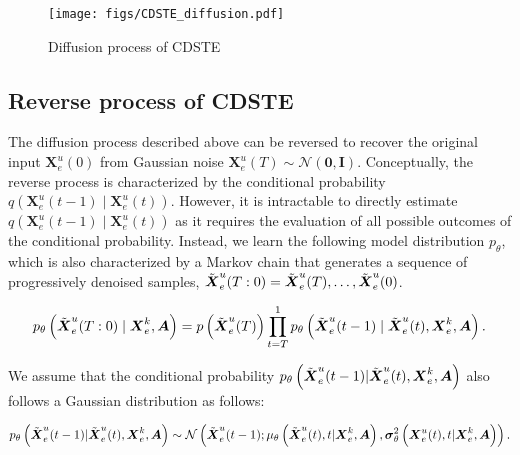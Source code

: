 \documentclass[a4paper,fleqn,12pt]{cas-sc}
\begin{document}
\begin{figure}[pos=htbp,width=8cm,align=\centering]
  \centering 
  \texttt{[image: figs/CDSTE\_diffusion.pdf]}
  \caption{Diffusion process of CDSTE}\label{fig:CDSTE_diffusion}
\end{figure}

\subsection{Reverse process of CDSTE}
The diffusion process described above can be reversed to recover the original input $\boldsymbol{X}^{u}_{e}(0)$ from Gaussian noise $\boldsymbol{X}^{u}_{e}(T) \sim \mathcal{N}\left(\boldsymbol{0}, \boldsymbol{I}\right)$. Conceptually, the reverse process is characterized by the conditional probability $q\left(\boldsymbol{X}^{u}_{e}(t-1) \mid \boldsymbol{X}^{u}_{e}(t)\right)$. However, it is intractable to directly estimate $q\left(\boldsymbol{X}^{u}_{e}(t-1) \mid \boldsymbol{X}^{u}_{e}(t)\right)$ as it requires the evaluation of all possible outcomes of the conditional probability. Instead, we learn the following model distribution $p_{\theta}$, which is also characterized by a Markov chain that generates a sequence of progressively denoised samples, $\Tilde{\boldsymbol{X}}^{u}_{e}(T:0)=\Tilde{\boldsymbol{X}}^{u}_{e}(T), \ldots, \Tilde{\boldsymbol{X}}^{u}_{e}(0)$.
\begin{linenomath*}
\begin{equation}
p_\theta\left(\Tilde{\boldsymbol{X}}^{u}_{e}(T:0)\mid \boldsymbol{X}^{k}_{e}, \boldsymbol{A}\right)=p\left(\Tilde{\boldsymbol{X}}^{u}_{e}(T)\right) \prod_{t=T}^{1} p_\theta\left(\Tilde{\boldsymbol{X}}^{u}_{e}(t-1) \mid \Tilde{\boldsymbol{X}}^{u}_{e}(t), \boldsymbol{X}^{k}_{e}, \boldsymbol{A}\right).
\label{equ:CondReverseMarkov}
\end{equation}
\end{linenomath*}
\noindent We assume that the conditional probability $p_\theta\left(\Tilde{\boldsymbol{X}}^{u}_{e}(t-1) | \Tilde{\boldsymbol{X}}^{u}_{e}(t), \boldsymbol{X}^{k}_{e}, \boldsymbol{A}\right)$ also follows a Gaussian distribution as follows:
\begin{linenomath*}
\begin{equation}
p_\theta\left(\Tilde{\boldsymbol{X}}^{u}_{e}(t-1) | \Tilde{\boldsymbol{X}}^{u}_{e}(t), \boldsymbol{X}^{k}_{e}, \boldsymbol{A}\right)\sim\mathcal{N}\left(\Tilde{\boldsymbol{X}}^{u}_{e}(t-1);\mu_\theta\left(\Tilde{\boldsymbol{X}}^{u}_{e}(t), t | \boldsymbol{X}^{k}_{e}, \boldsymbol{A}\right), \boldsymbol{\sigma}^{2}_{\theta}\left(\boldsymbol{X}^{u}_{e}(t), t | \boldsymbol{X}^{k}_{e}, \boldsymbol{A}\right)\right).
\label{equ:CDSTEreverse}
\end{equation}
\end{linenomath*}
\end{document}
